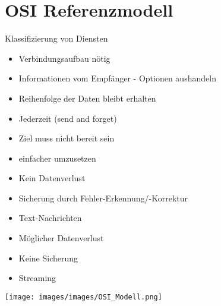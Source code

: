 \section{OSI Referenzmodell}
    \begin{highlight}{Klassifizierung von Diensten}
    \begin{center}
        \begin{minipage}{0.46\linewidth}
                    \begin{itemize}
                        \item Verbindungsaufbau nötig
                        \item Informationen vom Empfänger - Optionen aushandeln
                        \item Reihenfolge der Daten bleibt erhalten
                    \end{itemize}
                \begin{itemize}
                    \item Jederzeit (send and forget)
                    \item Ziel muss nicht bereit sein
                    \item einfacher umzusetzen
                \end{itemize}
        \end{minipage}
        \hfill\vline\hfill
        \begin{minipage}{0.47\linewidth}
                \begin{itemize}
                    \item Kein Datenverlust
                    \item Sicherung durch Fehler-Erkennung/-Korrektur
                    \item Text-Nachrichten
                \end{itemize}
            \begin{itemize}
                \item Möglicher Datenverlust
                \item Keine Sicherung
                \item Streaming
            \end{itemize}
        \end{minipage}
    \end{center}
\end{highlight}

\texttt{[image: images/images/OSI\_Modell.png]}




 
    
 